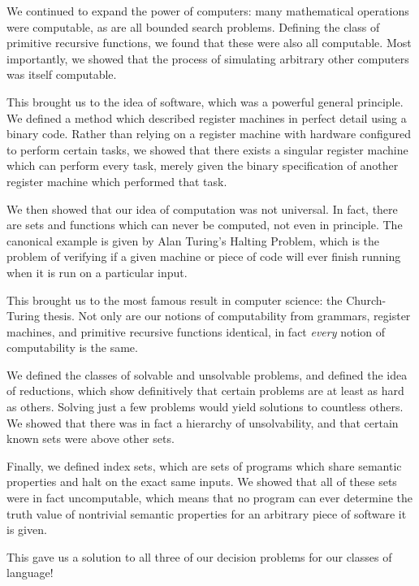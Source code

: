 \documentclass{article}
\begin{document}
We continued to expand the power of computers: many mathematical operations were computable, as are all bounded search problems. Defining the class of primitive recursive functions, we found that these were also all computable. Most importantly, we showed that the process of simulating arbitrary other computers was itself computable.

This brought us to the idea of software, which was a powerful general principle. We defined a method which described register machines in perfect detail using a binary code. Rather than relying on a register machine with hardware configured to perform certain tasks, we showed that there exists a singular register machine which can perform every task, merely given the binary specification of another register machine which performed that task.

We then showed that our idea of computation was not universal. In fact, there are sets and functions which can never be computed, not even in principle. The canonical example is given by Alan Turing's Halting Problem, which is the problem of verifying if a given machine or piece of code will ever finish running when it is run on a particular input.

This brought us to the most famous result in computer science: the Church-Turing thesis. Not only are our notions of computability from grammars, register machines, and primitive recursive functions identical, in fact \textit{every} notion of computability is the same.

We defined the classes of solvable and unsolvable problems, and defined the idea of reductions, which show definitively that certain problems are at least as hard as others. Solving just a few problems would yield solutions to countless others. We showed that there was in fact a hierarchy of unsolvability, and that certain known sets were above other sets.

Finally, we defined index sets, which are sets of programs which share semantic properties and halt on the exact same inputs. We showed that all of these sets were in fact uncomputable, which means that no program can ever determine the truth value of nontrivial semantic properties for an arbitrary piece of software it is given.

This gave us a solution to all three of our decision problems for our classes of language!

\renewcommand{\arraystretch}{1.3}
\end{document}
